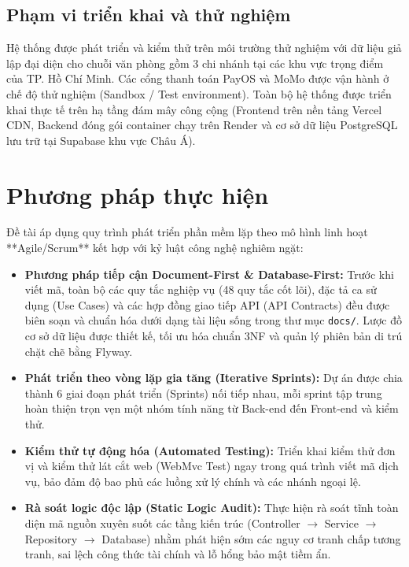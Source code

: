 \subsection{Phạm vi triển khai và thử nghiệm}
Hệ thống được phát triển và kiểm thử trên môi trường thử nghiệm với dữ liệu giả lập đại diện cho chuỗi văn phòng gồm 3 chi nhánh tại các khu vực trọng điểm của TP. Hồ Chí Minh. Các cổng thanh toán PayOS và MoMo được vận hành ở chế độ thử nghiệm (Sandbox / Test environment). Toàn bộ hệ thống được triển khai thực tế trên hạ tầng đám mây công cộng (Frontend trên nền tảng Vercel CDN, Backend đóng gói container chạy trên Render và cơ sở dữ liệu PostgreSQL lưu trữ tại Supabase khu vực Châu Á).

\section{Phương pháp thực hiện}
\label{sec:phuongphap}

Đề tài áp dụng quy trình phát triển phần mềm lặp theo mô hình linh hoạt **Agile/Scrum** kết hợp với kỷ luật công nghệ nghiêm ngặt:
\begin{itemize}
    \item \textbf{Phương pháp tiếp cận Document-First \& Database-First:} Trước khi viết mã, toàn bộ các quy tắc nghiệp vụ (48 quy tắc cốt lõi), đặc tả ca sử dụng (Use Cases) và các hợp đồng giao tiếp API (API Contracts) đều được biên soạn và chuẩn hóa dưới dạng tài liệu sống trong thư mục \texttt{docs/}. Lược đồ cơ sở dữ liệu được thiết kế, tối ưu hóa chuẩn 3NF và quản lý phiên bản di trú chặt chẽ bằng Flyway.
    \item \textbf{Phát triển theo vòng lặp gia tăng (Iterative Sprints):} Dự án được chia thành 6 giai đoạn phát triển (Sprints) nối tiếp nhau, mỗi sprint tập trung hoàn thiện trọn vẹn một nhóm tính năng từ Back-end đến Front-end và kiểm thử.
    \item \textbf{Kiểm thử tự động hóa (Automated Testing):} Triển khai kiểm thử đơn vị và kiểm thử lát cắt web (WebMvc Test) ngay trong quá trình viết mã dịch vụ, bảo đảm độ bao phủ các luồng xử lý chính và các nhánh ngoại lệ.
    \item \textbf{Rà soát logic độc lập (Static Logic Audit):} Thực hiện rà soát tĩnh toàn diện mã nguồn xuyên suốt các tầng kiến trúc (Controller $\rightarrow$ Service $\rightarrow$ Repository $\rightarrow$ Database) nhằm phát hiện sớm các nguy cơ tranh chấp tương tranh, sai lệch công thức tài chính và lỗ hổng bảo mật tiềm ẩn.
\end{itemize}


